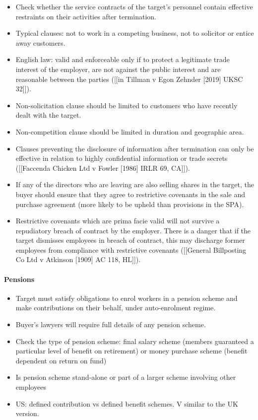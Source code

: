 \documentclass[
]{article}
\providecommand{\tightlist}{%
  \setlength{\itemsep}{0pt}\setlength{\parskip}{0pt}}
\begin{document}
\begin{itemize}
\tightlist
\item
  Check whether the service contracts of the target's personnel contain
  effective restraints on their activities after termination.
\item
  Typical clauses: not to work in a competing business, not to solicitor
  or entice away customers.
\item
  English law: valid and enforceable only if to protect a legitimate
  trade interest of the employer, are not against the public interest
  and are reasonable between the parties ({[}{[}in Tillman v Egon
  Zehnder {[}2019{]} UKSC 32{]}{]}).
\item
  Non-solicitation clause should be limited to customers who have
  recently dealt with the target.
\item
  Non-competition clause should be limited in duration and geographic
  area.
\item
  Clauses preventing the disclosure of information after termination can
  only be effective in relation to highly confidential information or
  trade secrets ({[}{[}Faccenda Chicken Ltd v Fowler {[}1986{]} IRLR 69,
  CA{]}{]}).
\item
  If any of the directors who are leaving are also selling shares in the
  target, the buyer should ensure that they agree to restrictive
  covenants in the sale and purchase agreement (more likely to be upheld
  than provisions in the SPA).
\item
  Restrictive covenants which are prima facie valid will not survive a
  repudiatory breach of contract by the employer. There is a danger that
  if the target dismisses employees in breach of contract, this may
  discharge former employees from compliance with restrictive covenants
  ({[}{[}General Billposting Co Ltd v Atkinson {[}1909{]} AC 118,
  HL{]}{]}).
\end{itemize}

\hypertarget{pensions}{%
\paragraph{Pensions}\label{pensions}}

\begin{itemize}
\tightlist
\item
  Target must satisfy obligations to enrol workers in a pension scheme
  and make contributions on their behalf, under auto-enrolment regime.
\item
  Buyer's lawyers will require full details of any pension scheme.
\item
  Check the type of pension scheme: final salary scheme (members
  guaranteed a particular level of benefit on retirement) or money
  purchase scheme (benefit dependent on return on fund)
\item
  Is pension scheme stand-alone or part of a larger scheme involving
  other employees
\item
  US: defined contribution vs defined benefit schemes. V similar to the
  UK version.
\end{itemize}
\end{document}
